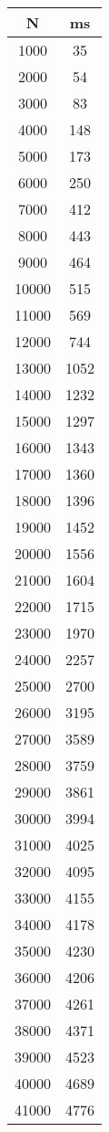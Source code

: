 \documentclass[ngerman,a4paper]{report}
\begin{document}
\begin{tabular}{|c|c|}
\hline
N & ms\\
\hline
1000 & 35\\
\hline
2000 & 54\\
\hline
3000 & 83\\
\hline
4000 & 148\\
\hline
5000 & 173\\
\hline
6000 & 250\\
\hline
7000 & 412\\
\hline
8000 & 443\\
\hline
9000 & 464\\
\hline
10000 & 515\\
\hline
11000 & 569\\
\hline
12000 & 744\\
\hline
13000 & 1052\\
\hline
14000 & 1232\\
\hline
15000 & 1297\\
\hline
16000 & 1343\\
\hline
17000 & 1360\\
\hline
18000 & 1396\\
\hline
19000 & 1452\\
\hline
20000 & 1556\\
\hline
21000 & 1604\\
\hline
22000 & 1715\\
\hline
23000 & 1970\\
\hline
24000 & 2257\\
\hline
25000 & 2700\\
\hline
26000 & 3195\\
\hline
27000 & 3589\\
\hline
28000 & 3759\\
\hline
29000 & 3861\\
\hline
30000 & 3994\\
\hline
31000 & 4025\\
\hline
32000 & 4095\\
\hline
33000 & 4155\\
\hline
34000 & 4178\\
\hline
35000 & 4230\\
\hline
36000 & 4206\\
\hline
37000 & 4261\\
\hline
38000 & 4371\\
\hline
39000 & 4523\\
\hline
40000 & 4689\\
\hline
41000 & 4776\\

\end{tabular}
\end{document}
